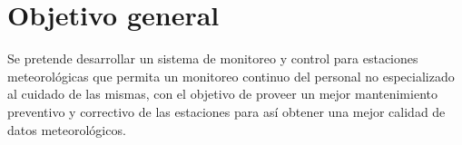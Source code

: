 \section{Objetivo general}

Se pretende desarrollar un sistema de monitoreo y control para estaciones meteorológicas que permita un monitoreo continuo del personal no especializado al cuidado de las mismas, con el objetivo de proveer un mejor mantenimiento preventivo y correctivo de las estaciones para así obtener una mejor calidad de datos meteorológicos.
